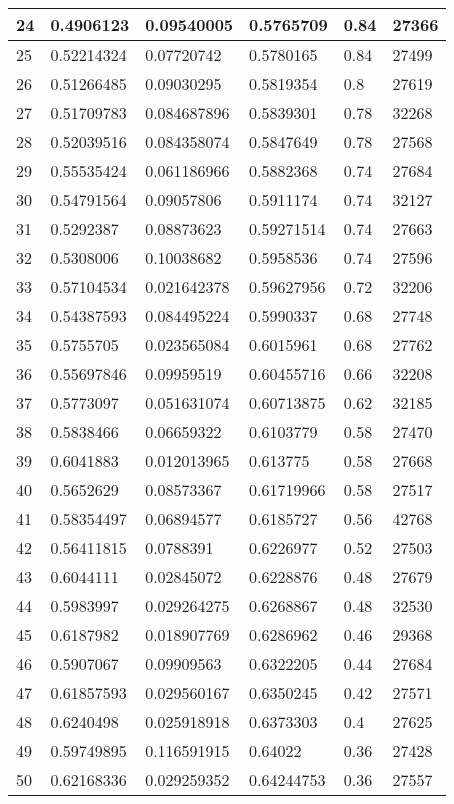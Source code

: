 \begin{longtable}{|l|l|l|l|l|l|}
24 & 0.4906123 & 0.09540005 & 0.5765709 & 0.84 & 27366 \\ \hline 
25 & 0.52214324 & 0.07720742 & 0.5780165 & 0.84 & 27499 \\ \hline 
26 & 0.51266485 & 0.09030295 & 0.5819354 & 0.8 & 27619 \\ \hline 
27 & 0.51709783 & 0.084687896 & 0.5839301 & 0.78 & 32268 \\ \hline 
28 & 0.52039516 & 0.084358074 & 0.5847649 & 0.78 & 27568 \\ \hline 
29 & 0.55535424 & 0.061186966 & 0.5882368 & 0.74 & 27684 \\ \hline 
30 & 0.54791564 & 0.09057806 & 0.5911174 & 0.74 & 32127 \\ \hline 
31 & 0.5292387 & 0.08873623 & 0.59271514 & 0.74 & 27663 \\ \hline 
32 & 0.5308006 & 0.10038682 & 0.5958536 & 0.74 & 27596 \\ \hline 
33 & 0.57104534 & 0.021642378 & 0.59627956 & 0.72 & 32206 \\ \hline 
34 & 0.54387593 & 0.084495224 & 0.5990337 & 0.68 & 27748 \\ \hline 
35 & 0.5755705 & 0.023565084 & 0.6015961 & 0.68 & 27762 \\ \hline 
36 & 0.55697846 & 0.09959519 & 0.60455716 & 0.66 & 32208 \\ \hline 
37 & 0.5773097 & 0.051631074 & 0.60713875 & 0.62 & 32185 \\ \hline 
38 & 0.5838466 & 0.06659322 & 0.6103779 & 0.58 & 27470 \\ \hline 
39 & 0.6041883 & 0.012013965 & 0.613775 & 0.58 & 27668 \\ \hline 
40 & 0.5652629 & 0.08573367 & 0.61719966 & 0.58 & 27517 \\ \hline 
41 & 0.58354497 & 0.06894577 & 0.6185727 & 0.56 & 42768 \\ \hline 
42 & 0.56411815 & 0.0788391 & 0.6226977 & 0.52 & 27503 \\ \hline 
43 & 0.6044111 & 0.02845072 & 0.6228876 & 0.48 & 27679 \\ \hline 
44 & 0.5983997 & 0.029264275 & 0.6268867 & 0.48 & 32530 \\ \hline 
45 & 0.6187982 & 0.018907769 & 0.6286962 & 0.46 & 29368 \\ \hline 
46 & 0.5907067 & 0.09909563 & 0.6322205 & 0.44 & 27684 \\ \hline 
47 & 0.61857593 & 0.029560167 & 0.6350245 & 0.42 & 27571 \\ \hline 
48 & 0.6240498 & 0.025918918 & 0.6373303 & 0.4 & 27625 \\ \hline 
49 & 0.59749895 & 0.116591915 & 0.64022 & 0.36 & 27428 \\ \hline 
50 & 0.62168336 & 0.029259352 & 0.64244753 & 0.36 & 27557 \\ \hline 
\end{longtable}